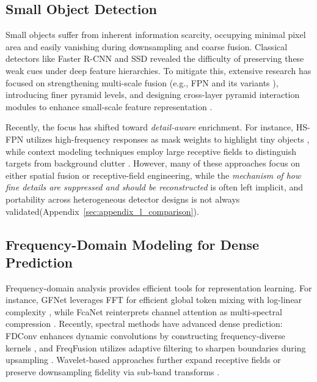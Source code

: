 \documentclass{article}
\theoremstyle{plain}
\theoremstyle{definition}
\theoremstyle{remark}
\begin{document}
  \subsection{Small Object Detection}
  
  Small objects suffer from inherent information scarcity, occupying minimal pixel area and easily vanishing during downsampling and coarse fusion. Classical detectors like Faster R-CNN and SSD \cite{fasterrcnn,ssd} revealed the difficulty of preserving these weak cues under deep feature hierarchies. To mitigate this, extensive research has focused on strengthening multi-scale fusion (e.g., FPN and its variants \cite{fpn,liu2018pathaggregationnetworkinstance,li2024rethinking}), introducing finer pyramid levels, and designing cross-layer pyramid interaction modules to enhance small-scale feature representation \cite{du2024cfpt}.
  
  Recently, the focus has shifted toward \emph{detail-aware} enrichment. For instance, HS-FPN utilizes high-frequency responses as mask weights to highlight tiny objects \cite{hs-fpn}, while context modeling techniques employ large receptive fields to distinguish targets from background clutter \cite{lsnet,fbrt-yolo}. However, many of these approaches focus on either spatial fusion or receptive-field engineering, while the \emph{mechanism of how fine details are suppressed and should be reconstructed} is often left implicit, and portability across heterogeneous detector designs is not always validated(Appendix~\ref{sec:appendix_l_comparison}).
  
  \subsection{Frequency-Domain Modeling for Dense Prediction}
  
  Frequency-domain analysis provides efficient tools for representation learning. For instance, GFNet leverages FFT for efficient global token mixing with log-linear complexity \cite{gfnet}, while FcaNet reinterprets channel attention as multi-spectral compression \cite{fcanet}. Recently, spectral methods have advanced dense prediction: FDConv enhances dynamic convolutions by constructing frequency-diverse kernels \cite{fdconv}, and FreqFusion utilizes adaptive filtering to sharpen boundaries during upsampling \cite{freqfusion}. Wavelet-based approaches further expand receptive fields or preserve downsampling fidelity via sub-band transforms \cite{wtconv,haar,wavelet-transformer}.
  
\end{document}
